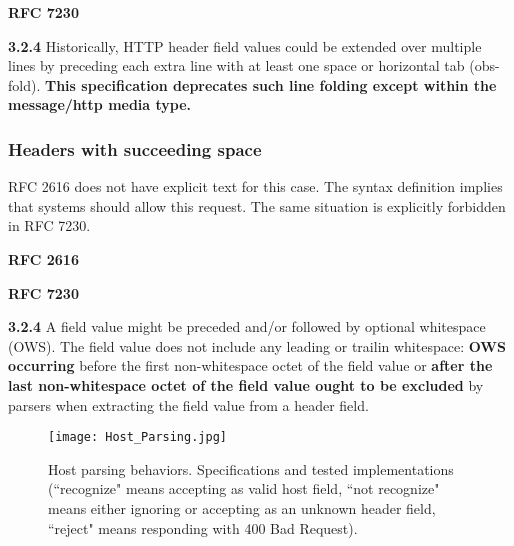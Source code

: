 \textbf{RFC 7230}
\columnseprule=1pt    %
\begin{multicols}{2}
	\begin{spacing}{0.8}
		\textbf{3.2.4} 
		{\footnotesize Historically, HTTP header field values could be extended over
		multiple lines by preceding each extra line with at least one space or horizontal tab (obs-fold).\textbf{ This specification deprecates such line folding except within the message/http media type.}}
	\end{spacing}
\end{multicols}

\subsubsection{Headers with succeeding space}
RFC 2616 does not have explicit text for this case. The syntax definition implies that systems should allow this request. The same situation is explicitly forbidden in RFC 7230.

\textbf{RFC 2616}
\columnseprule=1pt    %
\begin{multicols}{2}
	\begin{spacing}{0.8}
		\textbf{} 
		{\footnotesize  }
	\end{spacing}
\end{multicols}

\textbf{RFC 7230}
\columnseprule=1pt    %
\begin{multicols}{2}
	\begin{spacing}{0.8}
		\textbf{3.2.4} 
		{\footnotesize  A field value might be preceded and/or followed by optional
			whitespace (OWS). The field value does not include any leading or trailin whitespace: \textbf{OWS occurring} before the first non-whitespace octet of the field value or \textbf{after the last non-whitespace octet of the field value ought to be excluded} by parsers when extracting the field value from a header field.}
	\end{spacing}
\end{multicols}

\begin{figure*}[!htbp]
	\centering
	\texttt{[image: Host\_Parsing.jpg]}
	\caption{Host parsing behaviors. Specifications and tested implementations (``recognize" means accepting as valid host field, ``not recognize" means either ignoring or accepting as an unknown header field, ``reject" means responding with 400 Bad Request).}
	\label{fig:host_parsing}
\end{figure*}
